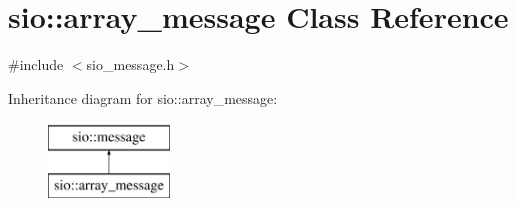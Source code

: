 \hypertarget{classsio_1_1array__message}{}\section{sio\+:\+:array\+\_\+message Class Reference}
\label{classsio_1_1array__message}


{\ttfamily \#include $<$sio\+\_\+message.\+h$>$}

Inheritance diagram for sio\+:\+:array\+\_\+message\+:\begin{figure}[H]
\begin{center}
\leavevmode
\includegraphics[height=2.000000cm]{classsio_1_1array__message}
\end{center}
\end{figure}
